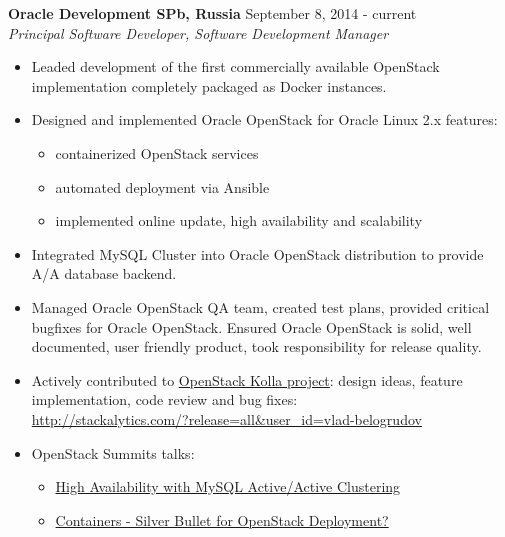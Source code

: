 \documentclass[a4paper,12pt,]{article}
\begin{document}
  \begin{description}

  \item{\bfseries Oracle Development SPb, Russia} \hfill September 8, 2014 - current \\
    {\em Principal Software Developer, Software Development Manager}

    \begin{itemize}

    \item Leaded development of the first commercially available OpenStack implementation completely packaged as Docker instances.

    \item Designed and implemented Oracle OpenStack for Oracle Linux 2.x features:
        \begin{itemize}
        \item containerized OpenStack services
        \item automated deployment via Ansible
        \item implemented online update, high availability and scalability
        \end{itemize}

    \item Integrated MySQL Cluster into Oracle OpenStack distribution to provide A/A database backend.

    \item Managed Oracle OpenStack QA team, created test plans, provided critical bugfixes for Oracle OpenStack. Ensured Oracle OpenStack is solid, well documented, user friendly product, took responsibility for release quality.
    
    \item Actively contributed to \href{https://docs.openstack.org/developer/kolla-ansible}{OpenStack Kolla project}: design ideas, feature implementation, code review and bug fixes:\\
       \url{http://stackalytics.com/?release=all&user_id=vlad-belogrudov}

    \item OpenStack Summits talks:
       \begin{itemize}
       \item \href{https://youtu.be/RJf7cwkytOE}{High Availability with MySQL Active/Active Clustering}
       \item \href{https://youtu.be/wzN3RHnVWdQ}{Containers - Silver Bullet for OpenStack Deployment?}
       \end{itemize}
    \end{itemize}


\end{description}
\end{document}
